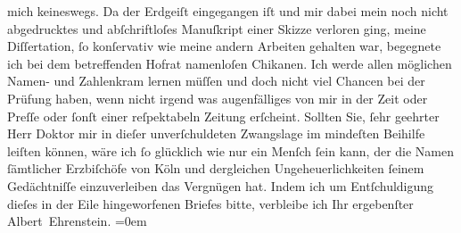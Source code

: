 \begin{ledgroupsized}[t]{13cm}
                    mich keineswegs. Da {\pb}der Erdgeiſt eingegangen iſt und mir dabei mein noch nicht abgedrucktes
                    und abſchriftloſes Manuſkript einer Skizze verloren ging, meine Diſſertation, ſo konſervativ wie meine
                    andern Arbeiten gehalten war, begegnete ich bei dem betreffenden Hofrat namenloſen
                    Chikanen. Ich werde allen möglichen Namen- und Zahlenkram lernen müſſen und doch
                    nicht viel Chancen bei der Prüfung haben, wenn nicht irgend was augenfälliges
                    von mir in der Zeit oder Preſſe oder ſonſt einer reſpektabeln Zeitung erſcheint.
                    Sollten Sie, {\pb}ſehr geehrter Herr Doktor mir in dieſer
                    unverſchuldeten Zwangslage im mindeſten Beihilfe leiſten können, wäre ich ſo
                    glücklich wie nur ein Menſch ſein kann, der die Namen ſämtlicher Erzbiſchöfe von
                        Köln und dergleichen Ungeheuerlichkeiten
                    ſeinem Gedächtniſſe einzuverleiben das Vergnügen hat.\pend
           \pstart
           Indem ich um Entſchuldigung dieſes in der Eile hingeworfenen Briefes bitte,
                    verbleibe ich\pend
           \pstart
           Ihr ergebenſter{\\[\baselineskip]}\spacefill\mbox{Albert Ehrenstein.}\pend
           \leftskip=0em{}
         
         \endnumbering{}\end{ledgroupsized}  \newcommand{\dateiname}{L01852}\newcommand{\titel}{Albert Ehrenstein an Arthur Schnitzler, 1. 7. 1909}\newcommand{\editorInnen}{Martin Anton Müller und Gerd-Hermann Susen}
      